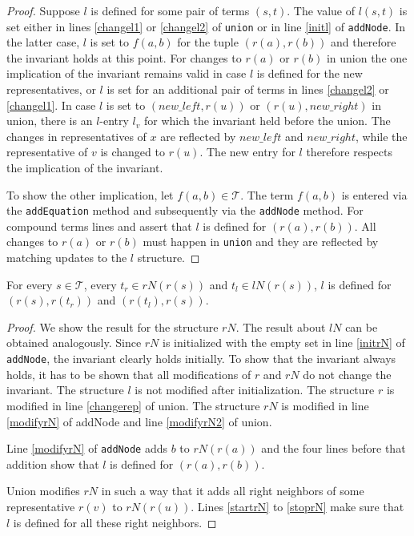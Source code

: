 \begin{proof}

Suppose $l$ is defined for some pair of terms $(s,t)$.
The value of $l(s,t)$ is set either in lines \ref{changel1} or \ref{changel2} of \texttt{union} or in line \ref{initl} of \texttt{addNode}.
In the latter case, $l$ is set to $f(a,b)$ for the tuple $(r(a),r(b))$ and therefore the invariant holds at this point.
For changes to $r(a)$ or $r(b)$ in union the one implication of the invariant remains valid in case $l$ is defined for the new representatives, or $l$ is set for an additional pair of terms in lines \ref{changel2} or \ref{changel1}.
In case $l$ is set to $(new\_left,r(u))$ or $(r(u),new\_right)$ in union, there is an $l$-entry $l_v$ for which the invariant held before the union.
The changes in representatives of $x$ are reflected by $new\_left$ and $new\_right$, while the representative of $v$ is changed to $r(u)$.
The new entry for $l$ therefore respects the implication of the invariant.

To show the other implication, let $f(a,b) \in \mathcal{T}$.
The term $f(a,b)$ is entered via the \texttt{addEquation} method and subsequently via the \texttt{addNode} method.
For compound terms lines  and  assert that $l$ is defined for $(r(a),r(b))$.
All changes to $r(a)$ or $r(b)$ must happen in \texttt{union} and they are reflected by matching updates to the $l$ structure.

\end{proof}


\begin{invariant}[Neighbours]

For every $s \in \mathcal{T}$, every $t_r \in rN(r(s))$ and $t_l \in lN(r(s))$, $l$ is defined for $(r(s),r(t_r))$ and $(r(t_l),r(s))$.

\end{invariant}

\begin{proof}

We show the result for the structure $rN$.
The result about $lN$ can be obtained analogously.
Since $rN$ is initialized with the empty set in line \ref{initrN} of \texttt{addNode}, the invariant clearly holds initially.
To show that the invariant always holds, it has to be shown that all modifications of $r$ and $rN$ do not change the invariant.
The structure $l$ is not modified after initialization.
The structure $r$ is modified in line \ref{changerep} of union.
The structure $rN$ is modified in line \ref{modifyrN} of addNode and line \ref{modifyrN2} of union.

Line \ref{modifyrN} of \texttt{addNode} adds $b$ to $rN(r(a))$ and the four lines before that addition show that $l$ is defined for $(r(a),r(b))$.

Union modifies $rN$ in such a way that it adds all right neighbors of some representative $r(v)$ to $rN(r(u))$.
Lines \ref{startrN} to \ref{stoprN} make sure that $l$ is defined for all these right neighbors.

\end{proof}

